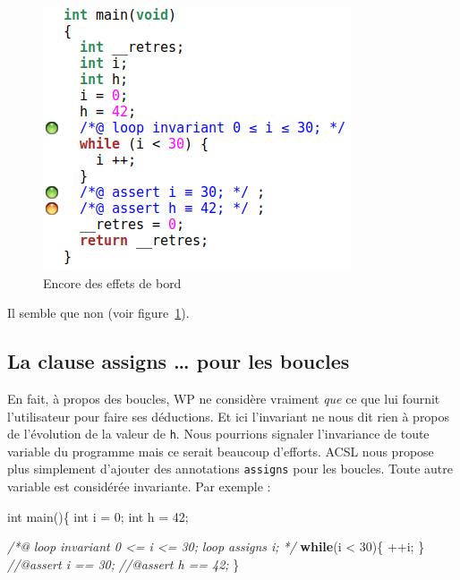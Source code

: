 \documentclass[12pt,francais,]{scrbook}
\newenvironment{Shaded}{}{}
\newcommand{\KeywordTok}[1]{\textcolor[rgb]{0.00,0.44,0.13}{\textbf{{#1}}}}
\newcommand{\DataTypeTok}[1]{\textcolor[rgb]{0.56,0.13,0.00}{{#1}}}
\newcommand{\DecValTok}[1]{\textcolor[rgb]{0.25,0.63,0.44}{{#1}}}
\newcommand{\CommentTok}[1]{\textcolor[rgb]{0.38,0.63,0.69}{\textit{{#1}}}}
\newcommand{\NormalTok}[1]{{#1}}
\begin{document}
\begin{figure}[htbp]
\centering
\includegraphics[scale=0.5]{3-3-boucle-effet-bord.png}
\caption{Encore des effets de bord}
\label{fig:3-3-loop-side-effect}
\end{figure}

Il semble que non (voir figure~\ref{fig:3-3-loop-side-effect}).

\subsection{\texorpdfstring{La clause \og{}assigns\fg{} \ldots{} pour les
boucles}{La clause assigns \ldots{} pour les boucles}}\label{la-clause-assigns-pour-les-boucles}

En fait, à propos des boucles, WP ne considère vraiment \emph{que} ce
que lui fournit l'utilisateur pour faire ses déductions. Et ici
l'invariant ne nous dit rien à propos de l'évolution de la valeur de
\texttt{h}. Nous pourrions signaler l'invariance de toute variable du
programme mais ce serait beaucoup d'efforts. ACSL nous propose plus
simplement d'ajouter des annotations \texttt{assigns} pour les boucles.
Toute autre variable est considérée invariante. Par exemple :

\begin{footnotesize}\begin{Shaded}
\begin{Highlighting}[]
\DataTypeTok{int} \NormalTok{main()\{}
  \DataTypeTok{int} \NormalTok{i = }\DecValTok{0}\NormalTok{;}
  \DataTypeTok{int} \NormalTok{h = }\DecValTok{42}\NormalTok{;}
  
  \CommentTok{/*@}
\CommentTok{    loop invariant 0 <= i <= 30;}
\CommentTok{    loop assigns i;}
\CommentTok{  */}
  \KeywordTok{while}\NormalTok{(i < }\DecValTok{30}\NormalTok{)\{}
    \NormalTok{++i;}
  \NormalTok{\}}
  \CommentTok{//@assert i == 30;}
  \CommentTok{//@assert h == 42;}
\NormalTok{\}}
\end{Highlighting}
\end{Shaded}\end{footnotesize}
\end{document}
